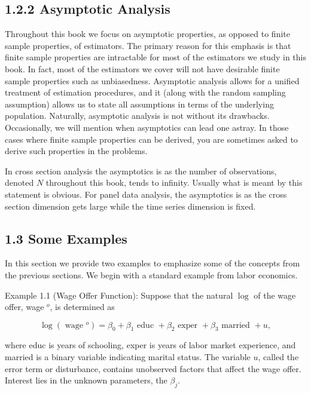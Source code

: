 \documentclass[10pt]{article}
\begin{document}
\subsection*{1.2.2 Asymptotic Analysis}
Throughout this book we focus on asymptotic properties, as opposed to finite sample properties, of estimators. The primary reason for this emphasis is that finite sample properties are intractable for most of the estimators we study in this book. In fact, most of the estimators we cover will not have desirable finite sample properties such as unbiasedness. Asymptotic analysis allows for a unified treatment of estimation procedures, and it (along with the random sampling assumption) allows us to state all assumptions in terms of the underlying population. Naturally, asymptotic analysis is not without its drawbacks. Occasionally, we will mention when asymptotics can lead one astray. In those cases where finite sample properties can be derived, you are sometimes asked to derive such properties in the problems.

In cross section analysis the asymptotics is as the number of observations, denoted $N$ throughout this book, tends to infinity. Usually what is meant by this statement is obvious. For panel data analysis, the asymptotics is as the cross section dimension gets large while the time series dimension is fixed.

\subsection*{1.3 Some Examples}
In this section we provide two examples to emphasize some of the concepts from the previous sections. We begin with a standard example from labor economics.

Example 1.1 (Wage Offer Function): Suppose that the natural $\log$ of the wage offer, wage ${ }^{o}$, is determined as


\begin{equation*}
\log \left(\text { wage }^{o}\right)=\beta_{0}+\beta_{1} \text { educ }+\beta_{2} \text { exper }+\beta_{3} \text { married }+u, \tag{1.1}
\end{equation*}


where educ is years of schooling, exper is years of labor market experience, and married is a binary variable indicating marital status. The variable $u$, called the error term or disturbance, contains unobserved factors that affect the wage offer. Interest lies in the unknown parameters, the $\beta_{j}$.
\end{document}
